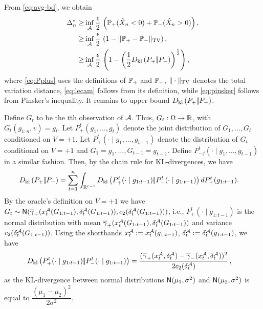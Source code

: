 From \eqref{eq:avg-bd}, we obtain
\begin{align}
\Delta_n^{*}  
  \ge & \inf_{\A} \dfrac{\epsilon }{2} \, \left(\P_{+}(\hat X_n < 0) + \P_{-}(\hat X_n > 0)\right), \label{eq:Pplus}\\
  \ge &\inf_{\A} \dfrac{\epsilon }{2} \,\left(1 - \tvnorm{\P_{+}- \P_{-}}\right), \label{eq:lecam}\\
  \ge &\inf_{\A} \dfrac{\epsilon }{2}  \,\left( 1 - \left(\frac12\dkl{P_{+}}{P_{-}}\right)^{\frac{1}{2}}\right), \label{eq:pinsker}
\end{align}
where 
 \eqref{eq:Pplus} uses the definitions of $\P_+$ and $\P_-$, $\tvnorm{\cdot}$ denotes the total variation distance,  
 \eqref{eq:lecam} follows from its definition, while \eqref{eq:pinsker} follows from Pinsker's inequality. 
It remains to upper bound $\dkl{P_{+}}{P_{-}}$.


Define $G_t$ to be the $t$th observation of $\A$. Thus, $G_t:\Omega \to \R$, with $G_t( g_{1:n}, v) = g_t$.
Let $P_+^t(g_1,\dots,g_t)$ denote the joint distribution of $G_1,\dots,G_t$ conditioned on $V=+1$.
Let $P_{+}^t(\cdot\mid g_1,\ldots,g_{t-1})$ denote the distribution of $G_t$ conditional on $V=+1$ and $G_1=g_1,\ldots,G_{t-1}=g_{t-1}$. Define  $P_{-j}^t(\cdot\mid g_1,\ldots,g_{t-1})$ in a similar fashion.
Then, by the chain rule for KL-divergences, we have
\begin{align}
\label{eq:dklchain}
&\dkl{P_{+}}{P_{-}}= \sum_{t=1}^n \int_{\R^{t-1}} \dkl{P_{+}^t(\cdot\mid g_{1:t-1})}{P_{-}^t(\cdot\mid g_{1:t-1})} d P_{+}^t( g_{1:t-1}).
\end{align}
By the oracle's definition on $V=+1$ we have
$G_t \sim  \normal(\overline{\gamma}_{+}(x^{\cA}_t(G_{1:t-1}),\delta_t^{\A}(G_{1:t-1})),c_2(\delta^{\A}_t(G_{1:t-1})))$, i.e., 
$P_{+}^t(\cdot\mid g_{1:t-1})$ is the normal distribution with mean 
$\overline{\gamma}_{+}(x^{\cA}_t(G_{1:t-1}),\delta^{\A}_t(G_{1:t-1}))$ and variance $c_2(\delta^{\A}_t(G_{1:t-1}))$.
Using the shorthands $x_t^{\A}:=x^{\A}_t(g_{1:t-1})$, $\delta_t^{\A}:=\delta^{\A}_t(g_{1:t-1})$,
we have
\begin{align*}
\dkl{P_{+}^t(\cdot\mid g_{1:t-1})}{P_{-}^t(\cdot\mid g_{1:t-1})}
& =\dfrac{(\overline{\gamma}_{+}(x_t^{\A},\delta_t^{\A}) - \overline{\gamma}_{-}(x_t^{\A},\delta_t^{\A}))^2}{2 c_2(\delta^{\A}_t)}\,,
\end{align*}
as the KL-divergence between normal distributions $\normal(\mu_1,\sigma^2)$ and $\normal(\mu_2,\sigma^2)$ is equal to $\dfrac{(\mu_1 - \mu_2)^2}{2 \sigma^2}$.

